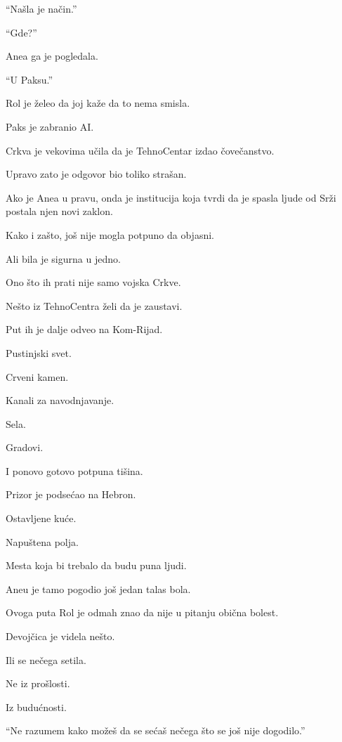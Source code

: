 ``Našla je način.''

``Gde?''

Anea ga je pogledala.

``U Paksu.''

\bigskip

Rol je želeo da joj kaže da to nema smisla.

Paks je zabranio AI.

Crkva je vekovima učila da je TehnoCentar izdao čovečanstvo.

\bigskip

Upravo zato je odgovor bio toliko strašan.

Ako je Anea u pravu, onda je institucija koja tvrdi da je spasla ljude od Srži postala njen novi zaklon.

\bigskip

Kako i zašto, još nije mogla potpuno da objasni.

Ali bila je sigurna u jedno.

Ono što ih prati nije samo vojska Crkve.

Nešto iz TehnoCentra želi da je zaustavi.

\bigskip

Put ih je dalje odveo na Kom-Rijad.

Pustinjski svet.

Crveni kamen.

Kanali za navodnjavanje.

Sela.

Gradovi.

I ponovo gotovo potpuna tišina.

\bigskip

Prizor je podsećao na Hebron.

Ostavljene kuće.

Napuštena polja.

Mesta koja bi trebalo da budu puna ljudi.

\bigskip

Aneu je tamo pogodio još jedan talas bola.

Ovoga puta Rol je odmah znao da nije u pitanju obična bolest.

Devojčica je videla nešto.

Ili se nečega setila.

Ne iz prošlosti.

Iz budućnosti.

\bigskip

``Ne razumem kako možeš da se sećaš nečega što se još nije dogodilo.''


